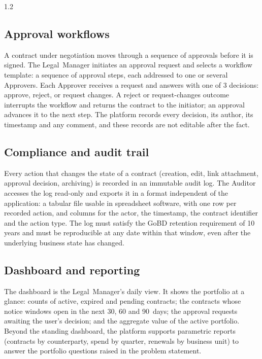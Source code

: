 \begin{spacing}{1.2}
\subsection{Approval workflows}
A contract under negotiation moves through a sequence of approvals
before it is signed. The Legal~Manager initiates an approval request
and selects a workflow template: a sequence of approval steps, each
addressed to one or several Approvers. Each Approver receives a request
and answers with one of 3 decisions: approve, reject, or request
changes. A reject or request-changes outcome interrupts the workflow
and returns the contract to the initiator; an approval advances it to
the next step. The platform records every decision, its author, its
timestamp and any comment, and these records are not editable after
the fact.

\subsection{Compliance and audit trail}
Every action that changes the state of a contract (creation, edit,
link attachment, approval decision, archiving) is recorded in an
immutable audit log. The Auditor accesses the log read-only and exports
it in a format independent of the application: a tabular file usable in
spreadsheet software, with one row per recorded action, and columns for
the actor, the timestamp, the contract identifier and the action type.
The log must satisfy the GoBD retention requirement of 10 years and
must be reproducible at any date within that window, even after the
underlying business state has changed.

\subsection{Dashboard and reporting}
The dashboard is the Legal~Manager's daily view. It shows the
portfolio at a glance: counts of active, expired and pending contracts;
the contracts whose notice windows open in the next 30, 60 and 90~days;
the approval requests awaiting the user's decision; and the aggregate
value of the active portfolio. Beyond the standing dashboard, the
platform supports parametric reports (contracts by counterparty,
spend by quarter, renewals by business unit) to answer the portfolio
questions raised in the problem statement.


\end{spacing}
